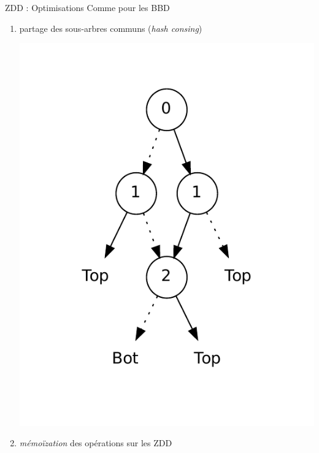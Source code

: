 \documentclass{beamer}
\begin{document}
\begin{frame}{ZDD : Optimisations}
Comme pour les BBD 
\begin{enumerate}
\item partage des sous-arbres communs (\emph{hash consing})
\begin{center}
\includegraphics[scale=0.4]{../imports/zdd_construct.pdf}
\end{center}
\item \emph{mémoïzation} des opérations sur les ZDD
\end{enumerate}


\end{frame}
\end{document}
